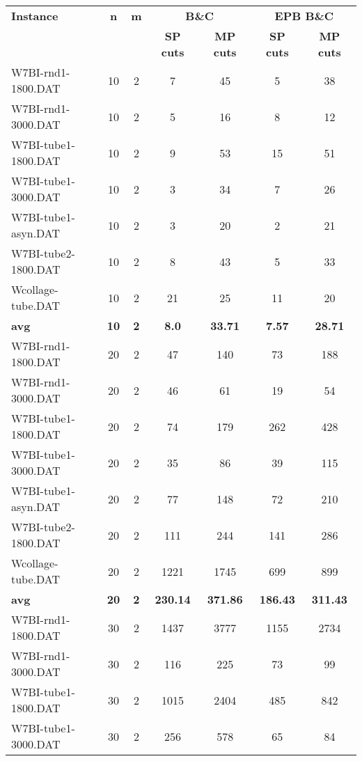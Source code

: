 \begin{table}[!ht]
\centering
\hspace*{-1cm}\begin{tabular}{lcccccc}
\toprule
\textbf{Instance} & \textbf{n} & \textbf{m} & \multicolumn{2}{c}{\textbf{B\&C}}  & \multicolumn{2}{c}{\textbf{EPB B\&C}}
\\
\cmidrule(r){4-5} \cmidrule(r){6-7} 
~ & ~ & ~ & \textbf{SP cuts} &\textbf{MP cuts} & \textbf{SP cuts} &\textbf{MP cuts} \\
\midrule

W7BI-rnd1-1800.DAT & 10 & 2 & 7 & 45 & 5 & 38 \\
W7BI-rnd1-3000.DAT & 10 & 2 & 5 & 16 & 8 & 12 \\
W7BI-tube1-1800.DAT & 10 & 2 & 9 & 53 & 15 & 51 \\
W7BI-tube1-3000.DAT & 10 & 2 & 3 & 34 & 7 & 26 \\
W7BI-tube1-asyn.DAT & 10 & 2 & 3 & 20 & 2 & 21 \\
W7BI-tube2-1800.DAT & 10 & 2 & 8 & 43 & 5 & 33 \\
Wcollage-tube.DAT & 10 & 2 & 21 & 25 & 11 & 20 \\
\cline{1-7} \textbf{avg} & \textbf{10} & \textbf{2} & \textbf{8.0} & \textbf{33.71} & \textbf{7.57} & \textbf{28.71} \\ \cline{1-7}
W7BI-rnd1-1800.DAT & 20 & 2 & 47 & 140 & 73 & 188 \\
W7BI-rnd1-3000.DAT & 20 & 2 & 46 & 61 & 19 & 54 \\
W7BI-tube1-1800.DAT & 20 & 2 & 74 & 179 & 262 & 428 \\
W7BI-tube1-3000.DAT & 20 & 2 & 35 & 86 & 39 & 115 \\
W7BI-tube1-asyn.DAT & 20 & 2 & 77 & 148 & 72 & 210 \\
W7BI-tube2-1800.DAT & 20 & 2 & 111 & 244 & 141 & 286 \\
Wcollage-tube.DAT & 20 & 2 & 1221 & 1745 & 699 & 899 \\
\cline{1-7} \textbf{avg} & \textbf{20} & \textbf{2} & \textbf{230.14} & \textbf{371.86} & \textbf{186.43} & \textbf{311.43} \\ \cline{1-7}
W7BI-rnd1-1800.DAT & 30 & 2 & 1437 & 3777 & 1155 & 2734 \\
W7BI-rnd1-3000.DAT & 30 & 2 & 116 & 225 & 73 & 99 \\
W7BI-tube1-1800.DAT & 30 & 2 & 1015 & 2404 & 485 & 842 \\
W7BI-tube1-3000.DAT & 30 & 2 & 256 & 578 & 65 & 84 \\

\end{tabular}
\end{table}
